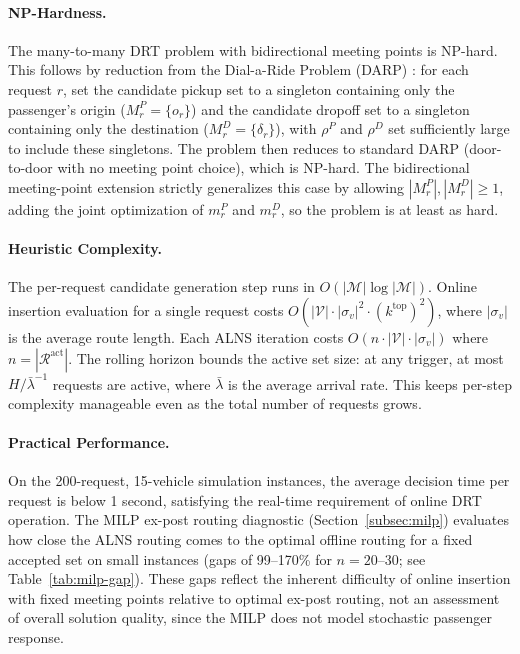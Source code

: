\paragraph{NP-Hardness.}
The many-to-many DRT problem with bidirectional meeting points is NP-hard. This follows
by reduction from the Dial-a-Ride Problem (DARP) \citep{cordeau2007}: for each request
$r$, set the candidate pickup set to a singleton containing only the passenger's origin
($M_r^P = \{o_r\}$) and the candidate dropoff set to a singleton containing only the
destination ($M_r^D = \{\delta_r\}$), with $\rho^P$ and $\rho^D$ set sufficiently large
to include these singletons. The problem then reduces to standard DARP (door-to-door
with no meeting point choice), which is NP-hard. The bidirectional meeting-point
extension strictly generalizes this case by allowing $|M_r^P|, |M_r^D| \geq 1$, adding
the joint optimization of $m_r^P$ and $m_r^D$, so the problem is at least as hard.

\paragraph{Heuristic Complexity.}
The per-request candidate generation step runs in $O(|\mathcal{M}| \log |\mathcal{M}|)$.
Online insertion evaluation for a single request costs
$O(|\mathcal{V}| \cdot |\sigma_v|^2 \cdot (k^{\text{top}})^2)$, where $|\sigma_v|$ is
the average route length. Each ALNS iteration costs
$O(n \cdot |\mathcal{V}| \cdot |\sigma_v|)$ where $n = |\mathcal{R}^{\text{act}}|$.
The rolling horizon bounds the active set size: at any trigger, at most
$H / \bar{\lambda}^{-1}$ requests are active, where $\bar{\lambda}$ is the average
arrival rate. This keeps per-step complexity manageable even as the total number of
requests grows.

\paragraph{Practical Performance.}
On the 200-request, 15-vehicle simulation instances, the average decision time per
request is below 1 second, satisfying the real-time requirement of online DRT operation.
The MILP ex-post routing diagnostic (Section~\ref{subsec:milp}) evaluates how close the
ALNS routing comes to the optimal offline routing for a fixed accepted set
on small instances (gaps of 99--170\% for $n = 20$--30; see Table~\ref{tab:milp-gap}).
These gaps reflect the inherent difficulty of online insertion with fixed meeting
points relative to optimal ex-post routing, not an assessment of overall solution
quality, since the MILP does not model stochastic passenger response.
